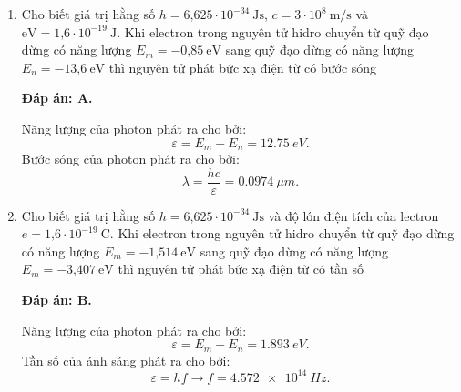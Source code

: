 \begin{enumerate}[label=\bfseries Câu \arabic*:]
{	}
	
	\item {} 
	
	\cauhoi
	{Cho biết giá trị hằng số $h=\text{6,625}\cdot 10^{-34}\ \text{Js}$, $c=3\cdot 10^8\ \text{m/s}$ và $\text{eV}=\text{1,6}\cdot 10^{-19}\ \text{J}$. Khi electron trong nguyên tử hidro chuyển từ quỹ đạo dừng có năng lượng $E_m=-\text{0,85}\ \text{eV}$ sang quỹ đạo dừng có năng lượng $E_n=-\text{13,6}\ \text{eV}$ thì nguyên tử phát bức xạ điện từ có bước sóng 
	}
	
	\loigiai
	{		\textbf{Đáp án: A.}
		
Năng lượng của photon phát ra cho bởi:
$$
	\varepsilon = E_{m} - E_{n} = \SI{12,75}{eV}.
$$
Bước sóng của photon phát ra cho bởi:
$$
	\lambda = \dfrac{hc}{\varepsilon} = \SI{0,0974}{\mu m}.
$$
		
	}
	
	\item {} 
	
	\cauhoi
	{Cho biết giá trị hằng số $h=\text{6,625}\cdot 10^{-34}\ \text{Js}$ và độ lớn điện tích của lectron $e=\text{1,6}\cdot 10^{-19}\ \text{C}$. Khi electron trong nguyên tử hidro chuyển từ quỹ đạo dừng có năng lượng  $E_m=-\text{1,514}\ \text{eV}$ sang quỹ đạo dừng có năng lượng  $E_m=-\text{3,407}\ \text{eV}$ thì nguyên tử phát bức xạ điện từ có tần số
	}
	
	\loigiai
	{		\textbf{Đáp án: B.}
		
Năng lượng của photon phát ra cho bởi:
$$
	\varepsilon = E_{m} - E_{n} = \SI{1,893}{eV}.
$$
Tần số của ánh sáng phát ra cho bởi:
$$
	\varepsilon = hf \rightarrow f = \SI{4,572 e14}{Hz}.
$$
		
}
\end{enumerate}

